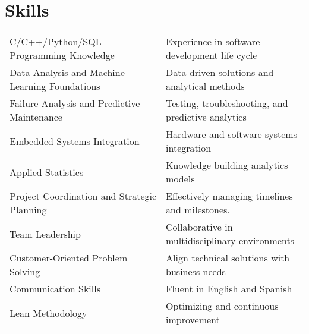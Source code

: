 \documentclass[a4paper,12pt]{article}
\begin{document}
\section{Skills}
\begin{tabularx}{\linewidth}{@{}l X@{}}
C/C++/Python/SQL Programming Knowledge &  \normalsize{Experience in software development life cycle}\\
Data Analysis and Machine Learning Foundations  &  \normalsize{Data-driven solutions and analytical methods}\\ 
Failure Analysis and Predictive Maintenance &  \normalsize{Testing, troubleshooting, and predictive analytics}\\
Embedded Systems Integration  &  \normalsize{Hardware and software systems integration}\\ 
Applied Statistics &  \normalsize{Knowledge building analytics models}\\
Project Coordination and Strategic Planning  &  \normalsize{Effectively managing timelines and milestones.}\\ 
Team Leadership &  \normalsize{Collaborative in multidisciplinary environments}\\
Customer-Oriented Problem Solving  &  \normalsize{Align technical solutions with business needs}\\ 
Communication Skills &  \normalsize{Fluent in English and Spanish}\\
Lean Methodology  &  \normalsize{Optimizing and continuous improvement}\\ 

\end{tabularx}

\vfill
{}
\end{document}
